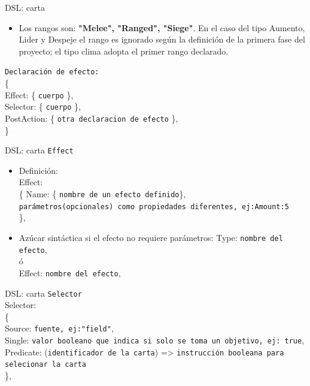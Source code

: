 \documentclass[a4paper, 12pt]{beamer}
\begin{document}
\begin{frame}{\textcolor{plata}{DSL: carta}}
\begin{itemize}
\item Los rangos son: \textbf{"Melee", "Ranged", "Siege"}. En el caso del tipo Aumento, Lider y Despeje el rango es ignorado según la definición de la primera fase del proyecto; el tipo clima adopta el primer rango declarado.
\end{itemize}
\texttt{Declaración de efecto:}\\
\{\\
\hspace{1cm} Effect: \{ \texttt{cuerpo} \},\\
\hspace{1cm} Selector: \{ \texttt{cuerpo} \},\\
\hspace{1cm} PostAction: \{ \texttt{otra declaracion de efecto} \},\\
\}
\end{frame}

\begin{frame}{\textcolor{plata}{DSL: carta}}
\texttt{Effect}\\
\begin{itemize}
\item Definición:\\
Effect:\\
\{
\hspace{1cm} Name: \{ \texttt{nombre de un efecto definido}\},\\
\hspace{1cm} \texttt{parámetros(opcionales) como propiedades diferentes, ej:Amount:5}\\
\},
\item Azúcar sintáctica si el efecto no requiere parámetros:
Type: \texttt{nombre del efecto},\\
ó\\
Effect: \texttt{nombre del efecto},
\end{itemize}
\end{frame}

\begin{frame}{\textcolor{plata}{DSL: carta}}
\texttt{Selector}\\
Selector:\\
\{\\
\hspace{1cm} Source: \texttt{fuente, ej:"field"},\\
\hspace{1cm} Single: \texttt{valor booleano que indica si solo se toma un objetivo, ej: true},\\
\hspace{1cm} Predicate: (\texttt{identificador de la carta}) => \texttt{instrucción booleana para selecionar la carta}\\
\},
\end{frame}
\end{document}
